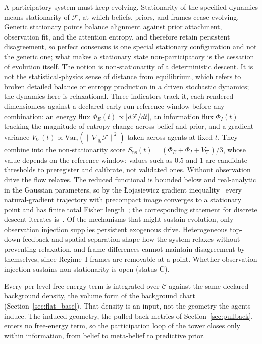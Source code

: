 A participatory system must keep evolving. Stationarity of the specified dynamics means stationarity of $\mathcal{F}$, at which beliefs, priors, and frames cease evolving. Generic stationary points balance alignment against prior attachment, observation fit, and the attention entropy, and therefore retain persistent disagreement, so perfect consensus is one special stationary configuration and not the generic one; what makes a stationary state non-participatory is the cessation of evolution itself. The notion is non-stationarity of a deterministic descent. It is not the statistical-physics sense of distance from equilibrium, which refers to broken detailed balance or entropy production in a driven stochastic dynamics; the dynamics here is relaxational. Three indicators track it, each rendered dimensionless against a declared early-run reference window before any combination: an energy flux $\Phi_E(t) \propto |d\mathcal{F}/dt|$, an information flux $\Phi_I(t)$ tracking the magnitude of entropy change across belief and prior, and a gradient variance $V_{\nabla}(t) \propto \mathrm{Var}_{i}(\|\nabla_{q_i}\mathcal{F}\|^2)$ taken across agents at fixed $t$. They combine into the non-stationarity score $S_{\mathrm{ns}}(t) = (\Phi_E + \Phi_I + V_{\nabla})/3$, whose value depends on the reference window; values such as $0.5$ and $1$ are candidate thresholds to preregister and calibrate, not validated ones. Without observation drive the flow relaxes. The reduced functional is bounded below and real-analytic in the Gaussian parameters, so by the {\L}ojasiewicz gradient inequality~\cite{Lojasiewicz1963} every natural-gradient trajectory with precompact image converges to a stationary point and has finite total Fisher length~\cite[Ch.~7, the finite-duration proposition]{DennisGaugeVFE2026}; the corresponding statement for discrete descent iterates is~\cite{absil2005convergence}. Of the mechanisms that might sustain evolution, only observation injection supplies persistent exogenous drive. Heterogeneous top-down feedback and spatial separation shape how the system relaxes without preventing relaxation, and frame differences cannot maintain disagreement by themselves, since Regime~I frames are removable at a point. Whether observation injection sustains non-stationarity is open (status C).

Every per-level free-energy term is integrated over $\mathcal{C}$ against the same declared background density, the volume form of the background chart (Section~\ref{sec:flat_base}). That density is an input, not the geometry the agents induce. The induced geometry, the pulled-back metrics of Section~\ref{sec:pullback}, enters no free-energy term, so the participation loop of the tower closes only within information, from belief to meta-belief to predictive prior.


